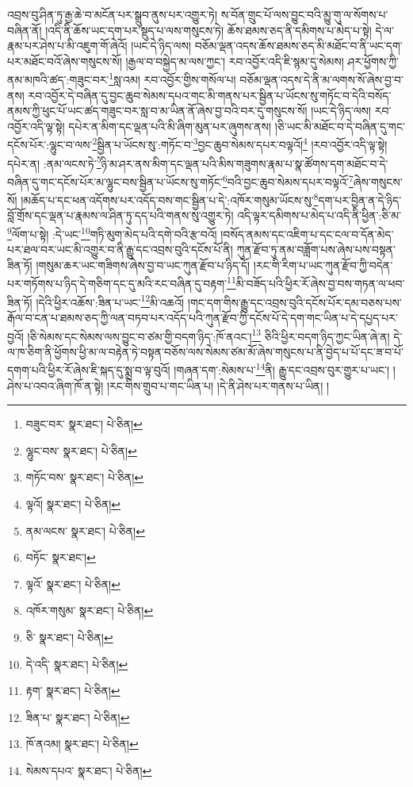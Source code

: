 འབྲས་བུ་ཤིན་ཏུ་རྒྱ་ཆེ་བ་མངོན་པར་སྒྲུབ་ནུས་པར་འགྱུར་ཏེ། ས་བོན་གྲུང་པོ་ལས་བྱུང་བའི་མྱུ་གུ་ལ་སོགས་པ་བཞིན་ནོ། །འདི་ནི་ཆོས་ཡང་དག་པར་སྡུད་པ་ལས་གསུངས་ཏེ། ཆོས་ཐམས་ཅད་ནི་དམིགས་པ་མེད་པ་སྟེ། དེ་ལ་རྣམ་པར་ཤེས་པ་མི་འཇུག་གོ་ཞེའོ། །ཡང་དེ་ཉིད་ལས། བཅོམ་ལྡན་འདས་ཆོས་ཐམས་ཅད་མི་མཐོང་བ་ནི་ཡང་དག་པར་མཐོང་བའོ་ཞེས་གསུངས་སོ། །རྒྱལ་བ་བསྐྱེད་མ་ལས་ཀྱང་། རབ་འབྱོར་འདི་ཇི་སྙམ་དུ་སེམས། ཤར་ཕྱོགས་ཀྱི་ནམ་མཁའི་ཚད་:གཟུང་བར་\footnote{བཟུང་བར་  སྣར་ཐང་།  པེ་ཅིན། }སླ་འམ། རབ་འབྱོར་གྱིས་གསོལ་པ། བཅོམ་ལྡན་འདས་དེ་ནི་མ་ལགས་སོ་ཞེས་བྱ་བ་ནས། རབ་འབྱོར་དེ་བཞིན་དུ་བྱང་ཆུབ་སེམས་དཔའ་གང་མི་གནས་པར་སྦྱིན་པ་ཡོངས་སུ་གཏོང་བ་དེའི་བསོད་ནམས་ཀྱི་ཕུང་པོ་ཡང་ཚད་གཟུང་བར་སླ་བ་མ་ཡིན་ནོ་ཞེས་བྱ་བའི་བར་དུ་གསུངས་སོ། །ཡང་དེ་ཉིད་ལས། རབ་འབྱོར་འདི་ལྟ་སྟེ། དཔེར་ན་མིག་དང་ལྡན་པའི་མི་ཞིག་མུན་པར་ཞུགས་ནས། །ཅི་ཡང་མི་མཐོང་བ་དེ་བཞིན་དུ་གང་དངོས་པོར་:ལྷུང་བ་ལས་\footnote{ལྷུང་བས་  སྣར་ཐང་།  པེ་ཅིན། }སྦྱིན་པ་ཡོངས་སུ་:གཏོང་བ་\footnote{གཏོང་བས་  སྣར་ཐང་།  པེ་ཅིན། }བྱང་ཆུབ་སེམས་དཔར་བལྟའོ།\footnote{ལྟའོ།  སྣར་ཐང་།  པེ་ཅིན། } །རབ་འབྱོར་འདི་ལྟ་སྟེ། དཔེར་ན། :ནམ་ལངས་ཏེ་\footnote{ནམ་ལངས་  སྣར་ཐང་།  པེ་ཅིན། }ཉི་མ་ཤར་ནས་མིག་དང་ལྡན་པའི་མིས་གཟུགས་རྣམ་པ་སྣ་ཚོགས་དག་མཐོང་བ་དེ་བཞིན་དུ་གང་དངོས་པོར་མ་ལྷུང་བས་སྦྱིན་པ་ཡོངས་སུ་གཏོང་\footnote{བཏོང་  སྣར་ཐང་། }བའི་བྱང་ཆུབ་སེམས་དཔར་བལྟའོ་\footnote{ལྟའོ་  སྣར་ཐང་།  པེ་ཅིན། }ཞེས་གསུངས་སོ། །མཆོད་པ་དང་ཕན་འདོགས་པར་འདོད་བས་གང་སྦྱིན་པ་དེ་:འཁོར་གསུམ་ཡོངས་སུ་\footnote{འཁོར་གསུམ་  སྣར་ཐང་།  པེ་ཅིན། }དག་པར་བྱིན་ན་དེ་ཉིད་བློ་གྲོས་དང་ལྡན་པ་རྣམས་ལ་ཤིན་ཏུ་དད་པའི་གནས་སུ་འགྱུར་ཏེ། འདི་ལྟར་དམིགས་པ་མེད་པ་འདི་ནི་ཕྱིན་:ཅི་མ་\footnote{ཅི་  སྣར་ཐང་།  པེ་ཅིན། }ལོག་པ་སྟེ། :དེ་ཡང་\footnote{དེ་འདི་  སྣར་ཐང་།  པེ་ཅིན། }གཏི་མུག་མེད་པའི་དགེ་བའི་རྩ་བའོ། །བསོད་ནམས་དང་འཇིག་པ་དང་ངལ་བ་དོན་མེད་པར་ཐལ་བར་ཡང་མི་འགྱུར་བ་ནི་རྒྱུ་དང་འབྲས་བུའི་དངོས་པོ་ནི། ཀུན་རྫོབ་ཏུ་ནམ་བཟློག་པས་ཞེས་པས་བསྟན་ཟིན་ཏོ། །གསུམ་ཆར་ཡང་གཟིགས་ཞེས་བྱ་བ་ཡང་ཀུན་རྫོབ་པ་ཉིད་དོ། །རང་གི་རིག་པ་ཡང་ཀུན་རྫོབ་ཀྱི་བདེན་པར་གཏོགས་པ་ཉིད་དེ་གཅིག་དང་དུ་མའི་རང་བཞིན་དུ་བརྟག་\footnote{རྟག་  སྣར་ཐང་།  པེ་ཅིན། }མི་བཟོད་པའི་ཕྱིར་རོ་ཞེས་བྱ་བས་གཏན་ལ་ཕབ་ཟིན་ཏོ། །དེའི་ཕྱིར་འཆོས་:ཟིན་པ་ཡང་\footnote{ཟིན་པ་  སྣར་ཐང་།  པེ་ཅིན། }མི་འཆའོ། །གང་དག་གིས་རྒྱུ་དང་འབྲས་བུའི་དངོས་པོར་དམ་བཅས་པས་རྒོལ་བ་ངན་པ་ཐམས་ཅད་ཀྱི་ལན་བཏབ་པར་འདོད་པའི་ཀུན་རྫོབ་ཀྱི་དངོས་པོ་དེ་དག་གང་ཡིན་པ་དེ་དཔྱད་པར་བྱའོ། །ཅི་སེམས་དང་སེམས་ལས་བྱུང་བ་ཙམ་གྱི་བདག་ཉིད་:ཁོ་ནའང་།\footnote{ཁོ་ནའམ།  སྣར་ཐང་།  པེ་ཅིན། } ཅིའི་ཕྱིར་བདག་ཉིད་ཀྱང་ཡིན་ཞེ་ན། དེ་ལ་ཁ་ཅིག་ནི་ཕྱོགས་ཕྱི་མ་ལ་བརྟེན་ཏེ་བསྟན་བཅོས་ལས་སེམས་ཙམ་མོ་ཞེས་གསུངས་པ་ནི་བྱེད་པ་པོ་དང་ཟ་བ་པོ་དགག་པའི་ཕྱིར་རོ་ཞེས་ཇི་སྐད་དུ་སྨྲ་བ་ལྟ་བུའོ། །གཞན་དག་:སེམས་པ་\footnote{སེམས་དཔའ་  སྣར་ཐང་།  པེ་ཅིན། }ནི། རྒྱུ་དང་འབྲས་བུར་གྱུར་པ་ཡང་། །ཤེས་པ་འབའ་ཞིག་ཁོ་ན་སྟེ། །རང་གིས་གྲུབ་པ་གང་ཡིན་པ། །དེ་ནི་ཤེས་པར་གནས་པ་ཡིན། །
